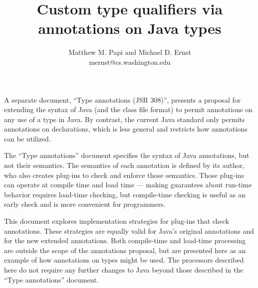 \documentclass[10pt]{article}
\begin{document}
\newcommand{\code}[1]{\ifmmode{\mbox{\smaller\ttfamily{#1}}}\else{\smaller\ttfamily #1}\fi}

\makeatletter
\def\topfigrule{\kern3\p@ \hrule \kern -3.4\p@} %
\def\botfigrule{\kern-3\p@ \hrule \kern 2.6\p@} %
\def\dblfigrule{\kern3\p@ \hrule \kern -3.4\p@} %
\makeatother



\title{Custom type qualifiers via annotations on Java types}
\author{Matthew M. Papi and Michael D. Ernst \\
{\ttfamily mernst@cs.washington.edu}
}
\maketitle


A separate document, ``Type annotations (JSR 308)'', presents a proposal for
extending the syntax of Java (and the class file format) to permit
annotations on any use of a type in Java.  By contrast, the current Java
standard only permits annotations on declarations, which is less general
and restricts how annotations can be utilized.

The ``Type annotations'' document specifies the syntax of Java
annotations, but not their semantics.  The semantics of each annotation is
defined by its author, who also creates plug-ins to check and enforce those
semantics.  Those plug-ins can operate at compile time and load time ---
making guarantees about run-time behavior requires load-time checking, but
compile-time checking is useful as an early check and is more convenient
for programmers.

This document explores implementation strategies for plug-ins that check
annotations.  These strategies are equally valid for Java's original
annotations and for the new extended annotations.  Both compile-time and
load-time processing are outside the scope of the annotations proposal, but
are presented here as an example of how annotations on types might be used.
The processors described here do not require any further changes to Java
beyond those described in the ``Type annotations'' document.
\end{document}
